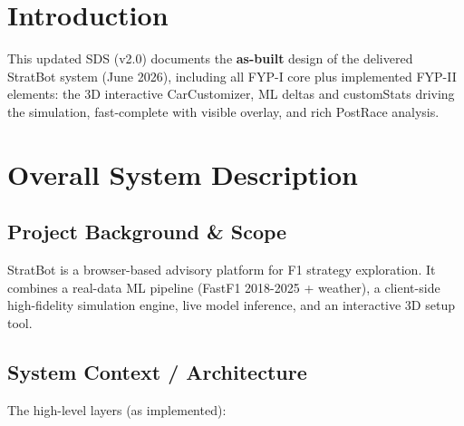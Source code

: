 \documentclass[12pt,a4paper]{article}
\begin{document}
\tableofcontents
\newpage

\section{Introduction}
This updated SDS (v2.0) documents the \textbf{as-built} design of the delivered StratBot system (June 2026), including all FYP-I core plus implemented FYP-II elements: the 3D interactive CarCustomizer, ML deltas and customStats driving the simulation, fast-complete with visible overlay, and rich PostRace analysis.

\section{Overall System Description}
\subsection{Project Background \& Scope}
StratBot is a browser-based advisory platform for F1 strategy exploration. It combines a real-data ML pipeline (FastF1 2018-2025 + weather), a client-side high-fidelity simulation engine, live model inference, and an interactive 3D setup tool.

\subsection{System Context / Architecture}
The high-level layers (as implemented):

\begin{center}
\end{center}
\end{document}
